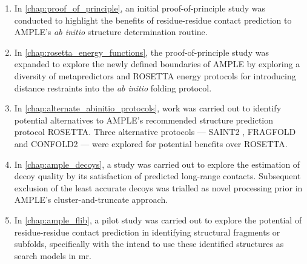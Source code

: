 \begin{enumerate}
    \item In \cref{chap:proof_of_principle}, an initial proof-of-principle study was conducted to highlight the benefits of residue-residue contact prediction to AMPLE's \textit{ab initio} structure determination routine.
    \item In \cref{chap:rosetta_energy_functions}, the proof-of-principle study was expanded to explore the newly defined boundaries of AMPLE by exploring a diversity of metapredictors and ROSETTA energy protocols for introducing distance restraints into the \textit{ab initio} folding protocol.
    \item In \cref{chap:alternate_abinitio_protocols}, work was carried out to identify potential alternatives to AMPLE's recommended structure prediction protocol ROSETTA. Three alternative protocols --- SAINT2 \cite{De_Oliveira2018-sg}, FRAGFOLD \cite{Kosciolek2014-bt} and CONFOLD2 \cite{Adhikari2018-lj} --- were explored for potential benefits over ROSETTA.
    \item In \cref{chap:ample_decoys}, a study was carried out to explore the estimation of decoy quality by its satisfaction of predicted long-range contacts. Subsequent exclusion of the least accurate decoys was trialled as novel processing prior in AMPLE's cluster-and-truncate approach.
    \item In \cref{chap:ample_flib}, a pilot study was carried out to explore the potential of residue-residue contact prediction in identifying structural fragments or subfolds, specifically with the intend to use these identified structures as search models in \gls{mr}. 
\end{enumerate}
